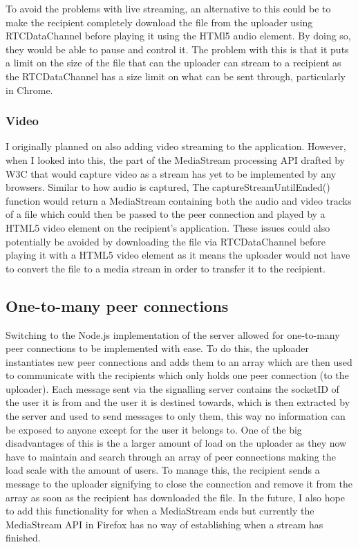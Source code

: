 \documentclass[]{report}
\begin{document}
				To avoid the problems with live streaming, an alternative to this could be to make the recipient completely download the file from the uploader using RTCDataChannel before playing it using the HTMl5 audio element. By doing so, they would be able to pause and control it. The problem with this is that it puts a limit on the size of the file that can the uploader can stream to a recipient as the RTCDataChannel has a size limit on what can be sent through, particularly in Chrome.

				\subsubsection{Video}
				I originally planned on also adding video streaming to the application. However, when I looked into this, the part of the MediaStream processing API drafted by W3C that would capture video as a stream has yet to be implemented by any browsers. Similar to how audio is captured, The captureStreamUntilEnded() function would return a MediaStream containing both the audio and video tracks of a file which could then be passed to the peer connection and played by a HTML5 video element on the recipient's application. These issues could also potentially be avoided by downloading the file via RTCDataChannel before playing it with a HTML5 video element as it means the uploader would not have to convert the file to a media stream in order to transfer it to the recipient.
			
			\subsection{One-to-many peer connections}
			Switching to the Node.js implementation of the server allowed for one-to-many peer connections to be implemented with ease. To do this, the uploader instantiates new peer connections and adds them to an array which are then used to communicate with the recipients which only holds one peer connection (to the uploader). Each message sent via the signalling server contains the socketID of the user it is from and the user it is destined towards, which is then extracted by the server and used to send messages to only them, this way no information can be exposed to anyone except for the user it belongs to. One of the big disadvantages of this is the a larger amount of load on the uploader as they now have to maintain and search through an array of peer connections making the load scale with the amount of users. To manage this, the recipient sends a message to the uploader signifying to close the connection and remove it from the array as soon as the recipient has downloaded the file. In the future, I also hope to add this functionality for when a MediaStream ends but currently the MediaStream API in Firefox has no way of establishing when a stream has finished.
			 
\end{document}
